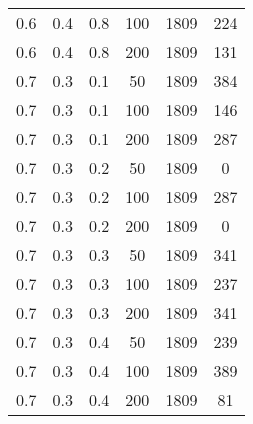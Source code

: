 \begin{table}[h]
\begin{center}
\begin{tabular}{|c|c|c|c|c|c|}
		0.6 &  0.4 &  0.8 &  100 &  1809 &   224 \\
		0.6 &  0.4 &  0.8 &  200 &  1809 &   131 \\
	   \hline
		0.7 &  0.3 &  0.1 &   50 &  1809 &   384 \\
		0.7 &  0.3 &  0.1 &  100 &  1809 &   146 \\
		0.7 &  0.3 &  0.1 &  200 &  1809 &   287 \\
	   \hline
		0.7 &  0.3 &  0.2 &   50 &  1809 &     0 \\
		0.7 &  0.3 &  0.2 &  100 &  1809 &   287 \\
		0.7 &  0.3 &  0.2 &  200 &  1809 &     0 \\
	   \hline
		0.7 &  0.3 &  0.3 &   50 &  1809 &   341 \\
		0.7 &  0.3 &  0.3 &  100 &  1809 &   237 \\
		0.7 &  0.3 &  0.3 &  200 &  1809 &   341 \\
	   \hline
		0.7 &  0.3 &  0.4 &   50 &  1809 &   239 \\
		0.7 &  0.3 &  0.4 &  100 &  1809 &   389 \\
		0.7 &  0.3 &  0.4 &  200 &  1809 &    81 \\
	   \hline
        		\end{tabular}
	\end{center}
\end{table}
